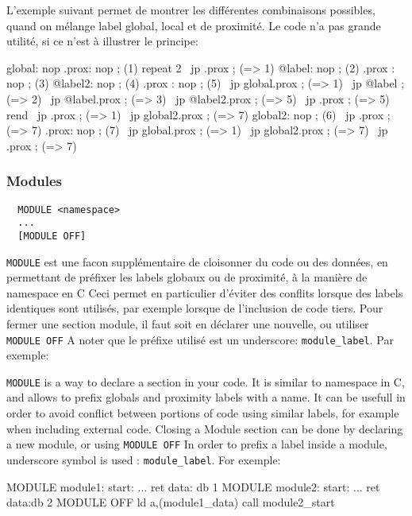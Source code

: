 \begin{xfr}
L'exemple suivant permet de montrer les différentes combinaisons possibles, quand on mélange label global, local et de proximité.
Le code n'a pas grande utilité, si ce n'est à illustrer le principe:
\end{xfr}

\begin{code}
  global: nop
  .prox:  nop ; (1)
  \medskip
  repeat 2
  \           jp .prox ;  (=> 1)
  @label:   nop  ; (2)
  .prox :   nop  ; (3)
  @label2:  nop  ; (4)
  .prox :   nop  ; (5)
  \           jp global.prox  ; (=> 1)
  \           jp @label       ; (=> 2)
  \           jp @label.prox  ; (=> 3)
  \           jp @label2.prox ; (=> 5)
  \           jp .prox        ; (=> 5)
  rend
  \medskip
  \           jp .prox        ; (=> 1)
  \           jp global2.prox ; (=> 7)
  \medskip
  global2:    nop  ; (6)
  \           jp .prox        ; (=> 7)
  .prox:      nop ; (7)
  \           jp global.prox  ; (=> 1)
  \           jp global2.prox ; (=> 7)
  \           jp .prox        ; (=> 7)
  \end{code}


\subsubsection{Modules}\label{MODULES}

\begin{verbatim}
  MODULE <namespace>
  ...
  [MODULE OFF]
\end{verbatim}

\begin{xfr}

\texttt{MODULE} est une facon supplémentaire de cloisonner du code ou des données, en permettant de préfixer les labels globaux ou de proximité, à la manière de namespace en C
Ceci permet en particulier d'éviter des conflits lorsque des labels identiques sont utilisés, par exemple lorsque de l'inclusion de code tiers.
Pour fermer une section module, il faut soit en déclarer une nouvelle, ou utiliser \texttt{MODULE OFF}
A noter que le préfixe utilisé est un underscore: \texttt{module\_label}. Par exemple:
\end{xfr}

\begin{xen}
\texttt{MODULE} is a way to declare a section in your code. It is similar to namespace in C, and allows to prefix globals and proximity labels with a name.
It can be usefull in order to avoid conflict between portions of code using similar labels, for example when including external code.
Closing a Module section can be done by declaring a new module, or using \texttt{MODULE OFF}
In order to prefix a label inside a module, underscore symbol is used : \texttt{module\_label}. For exemple:
\end{xen}

\begin{code}
  MODULE module1:
  start:
    ...
    ret
  data: db 1
\medskip
MODULE module2:
  start:
    ...
    ret
  data:db 2
MODULE OFF
\medskip
 ld a,(module1\_data)
 call module2\_start
\end{code}
